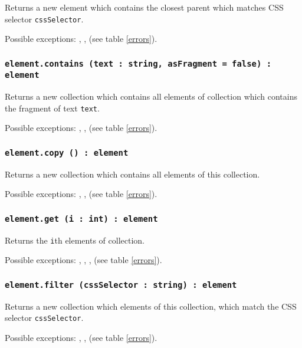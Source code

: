 Returns a new element which contains the closest parent which matches CSS selector \texttt{cssSelector}.

Possible exceptions: , ,  (see table \ref{errors}).

\subsubsection{\texttt{element.contains (text : string, asFragment = false) : element}}

Returns a new collection which contains all elements of collection which contains the fragment of text \texttt{text}.

Possible exceptions: , ,  (see table \ref{errors}).

\subsubsection{\texttt{element.copy () : element}}

Returns a new collection which contains all elements of this collection.

Possible exceptions: , ,  (see table \ref{errors}).

\subsubsection{\texttt{element.get (i : int) : element}}

Returns the \texttt{i}th elements of collection.

Possible exceptions: , , ,  (see table \ref{errors}).

\subsubsection{\texttt{element.filter (cssSelector : string) : element}}

Returns a new collection which elements of this collection, which match the CSS selector \texttt{cssSelector}.

Possible exceptions: , ,  (see table \ref{errors}).
